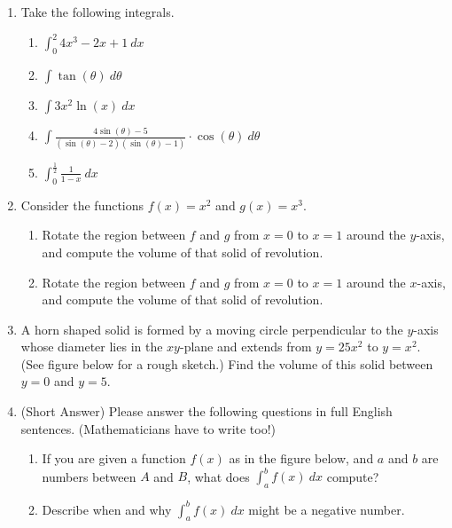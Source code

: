 \documentclass[10pt]{amsart}
\begin{document}
\begin{enumerate}

\item Take the following integrals.
\begin{enumerate}
\item $\int_0^2 4x^3-2x+1\  dx$
\vfill
\item $\int \tan(\theta)\ d\theta$
\vfill
\item $\int 3x^2\ln(x)\ dx$
\vfill\pagebreak
\item $\int \frac{4\sin(\theta)-5}{(\sin(\theta)-2)(\sin(\theta)-1)}
\cdot\cos(\theta)\ d\theta$
\vfill
\item $\int_0^{\frac{1}{2}} \frac{1}{1-x}\ dx$
\end{enumerate}

\vfill\pagebreak

\item Consider the functions $f(x)=x^2$ and $g(x)=x^3$.

\begin{enumerate}
\item Rotate the region between $f$ and $g$ from $x=0$ to
$x=1$ around the $y$-axis, and compute the volume of that solid of
revolution. 
\vfill 
\item  Rotate the region between $f$ and $g$ from $x=0$ to
$x=1$ around the $x$-axis, and compute the volume of that solid of
revolution. 
\end{enumerate}
\vfill\pagebreak

\item A horn shaped solid is formed by a moving circle perpendicular
to the $y$-axis whose diameter lies in the $xy$-plane and extends from 
$y=25x^2$ to $y=x^2$.  (See figure below for a rough sketch.)    Find
the volume of this solid between $y=0$ and $y=5$.


\begin{figure}[h]
\hfill{}
\end{figure}

\vfill\pagebreak

\item ({\sc Short Answer})  Please answer the following questions in
full English sentences.  (Mathematicians have to write too!)

\begin{enumerate}
\item If you are given a function $f(x)$ as in the figure below, and
$a$ and $b$ are numbers between $A$ and $B$, what 
does $\int_a^b f(x)\ dx$ compute?
\begin{figure}[h]
\hfill{}
\end{figure}
\vfill
\item Describe when and why $\int_a^b f(x)\ dx$ might be a negative number.
\end{enumerate}



\end{enumerate}
\end{document}
